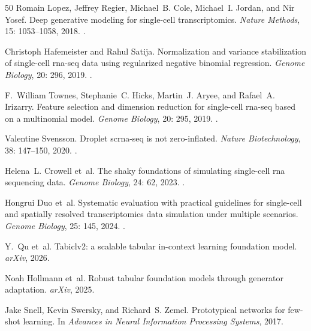 \documentclass[12pt]{article}
\begin{document}
\begin{thebibliography}{50}
Romain Lopez, Jeffrey Regier, Michael~B. Cole, Michael~I. Jordan, and Nir
  Yosef.
\newblock Deep generative modeling for single-cell transcriptomics.
\newblock \emph{Nature Methods}, 15: 1053--1058, 2018.
\newblock {}.

Christoph Hafemeister and Rahul Satija.
\newblock Normalization and variance stabilization of single-cell rna-seq data
  using regularized negative binomial regression.
\newblock \emph{Genome Biology}, 20: 296, 2019.
\newblock {}.

F.~William Townes, Stephanie~C. Hicks, Martin~J. Aryee, and Rafael~A. Irizarry.
\newblock Feature selection and dimension reduction for single-cell rna-seq
  based on a multinomial model.
\newblock \emph{Genome Biology}, 20: 295, 2019.
\newblock {}.

Valentine Svensson.
\newblock Droplet scrna-seq is not zero-inflated.
\newblock \emph{Nature Biotechnology}, 38: 147--150, 2020.
\newblock {}.

Helena~L. Crowell et~al.
\newblock The shaky foundations of simulating single-cell rna sequencing data.
\newblock \emph{Genome Biology}, 24: 62, 2023.
\newblock {}.

Hongrui Duo et~al.
\newblock Systematic evaluation with practical guidelines for single-cell and
  spatially resolved transcriptomics data simulation under multiple scenarios.
\newblock \emph{Genome Biology}, 25: 145, 2024.
\newblock {}.

Y.~Qu et~al.
\newblock Tabiclv2: a scalable tabular in-context learning foundation model.
\newblock \emph{arXiv}, 2026.

Noah Hollmann et~al.
\newblock Robust tabular foundation models through generator adaptation.
\newblock \emph{arXiv}, 2025{}.



Jake Snell, Kevin Swersky, and Richard~S. Zemel.
\newblock Prototypical networks for few-shot learning.
\newblock In \emph{Advances in Neural Information Processing Systems}, 2017.


\end{thebibliography}
\end{document}
